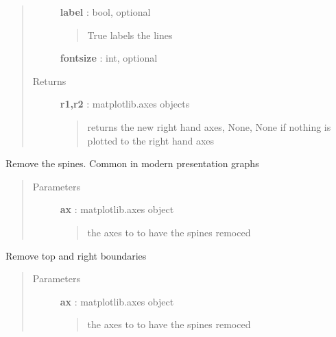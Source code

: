 \documentclass[letterpaper,10pt,english]{sphinxmanual}
\begin{document}
\begin{fulllineitems}
\begin{quote}
\begin{description}
\textbf{label} : bool, optional
\begin{quote}

True labels the lines
\end{quote}

\textbf{fontsize} : int, optional

\item[{Returns}] \leavevmode
\textbf{r1,r2} : matplotlib.axes objects
\begin{quote}

returns the new right hand axes, None, None if nothing is plotted to the right hand axes
\end{quote}

\end{description}\end{quote}

\end{fulllineitems}


\begin{fulllineitems}
\label{pubplots:pubplots.plot.remove_boundary}
Remove the spines. Common in modern presentation graphs
\begin{quote}\begin{description}
\item[{Parameters}] \leavevmode
\textbf{ax} : matplotlib.axes object
\begin{quote}

the axes to to have the spines remoced
\end{quote}

\end{description}\end{quote}

\end{fulllineitems}


\begin{fulllineitems}
\label{pubplots:pubplots.plot.remove_right_top}
Remove top and right boundaries
\begin{quote}\begin{description}
\item[{Parameters}] \leavevmode
\textbf{ax} : matplotlib.axes object
\begin{quote}

the axes to to have the spines remoced
\end{quote}

\end{description}\end{quote}

\end{fulllineitems}
\end{document}

